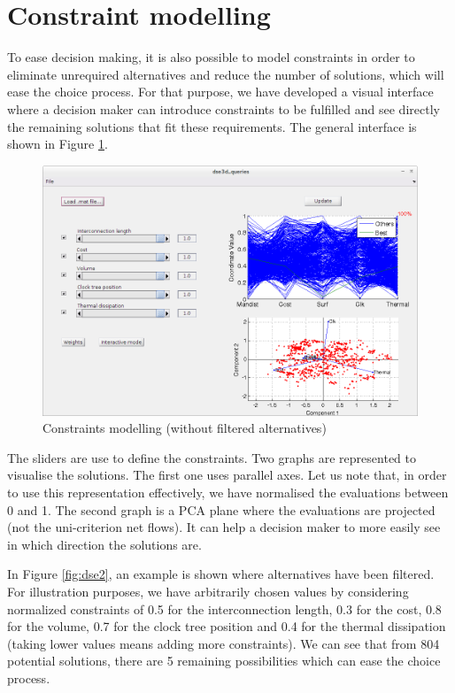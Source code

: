 \section{Constraint modelling}
To ease decision making, it is also possible to model constraints in order to eliminate unrequired alternatives and reduce the number of solutions, which will ease the choice process. For that purpose, we have developed a visual interface where a decision maker can introduce constraints to be fulfilled and see directly the remaining solutions that fit these requirements. The general interface is shown in Figure \ref{fig:dse1}.

\begin{figure}[h!]
\begin{center}
\includegraphics[width=\linewidth]{dseconstraints}
\end{center}
\caption{Constraints modelling (without filtered alternatives)}
\label{fig:dse1}
\end{figure}

The sliders are use to define the constraints. Two graphs are represented to visualise the solutions. The first one uses parallel axes. Let us note that, in order to use this representation effectively, we have normalised the evaluations between 0 and 1. The second graph is a PCA plane where the evaluations are projected (not the uni-criterion net flows). It can help a decision maker to more easily see in which direction the solutions are.

In Figure \ref{fig:dse2}, an example is shown where alternatives have been filtered. For illustration purposes, we have arbitrarily chosen values by considering normalized constraints of 0.5 for the interconnection length, 0.3 for the cost, 0.8 for the volume, 0.7 for the clock tree position and 0.4 for the thermal dissipation (taking lower values means adding more constraints). We can see that from 804 potential solutions, there are 5 remaining possibilities which can ease the choice process.


